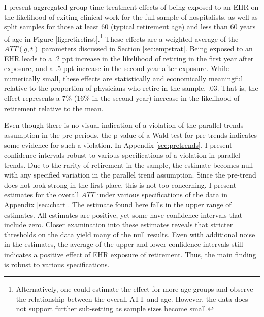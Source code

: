 \documentclass[12pt]{article}
\begin{document}
I present aggregated group time treatment effects of being exposed to an EHR on the likelihood of exiting clinical work for the full sample of hospitalists, as well as split samples for those at least 60 (typical retirement age) and less than 60 years of age in Figure \ref{fig:retirefirst}.\footnote{Alternatively, one could estimate the effect for more age groups and observe the relationship between the overall ATT and age. However, the data does not support further sub-setting as sample sizes become small.} These effects are a weighted average of the $ATT(g,t)$ parameters discussed in Section \ref{sec:empstrat}. Being exposed to an EHR leads to a .2 ppt increase in the likelihood of retiring in the first year after exposure, and a .5 ppt increase in the second year after exposure. While numerically small, these effects are statistically and economically meaningful relative to the proportion of physicians who retire in the sample, .03. That is, the effect represents a 7\% (16\% in the second year) increase in the likelihood of retirement relative to the mean. 

Even though there is no visual indication of a violation of the parallel trends assumption in the pre-periods, the p-value of a Wald test for pre-trends indicates some evidence for such a violation. In Appendix \ref{sec:pretrends}, I present confidence intervals robust to various specifications of a violation in parallel trends. Due to the rarity of retirement in the sample, the estimate becomes null with any specified variation in the parallel trend assumption. Since the pre-trend does not look strong in the first place, this is not too concerning. I present estimates for the overall $ATT$ under various specifications of the data in Appendix \ref{sec:chart}. The estimate found here falls in the upper range of estimates. All estimates are positive, yet some have confidence intervals that include zero. Closer examination into these estimates reveals that stricter thresholds on the data yield many of the null results. Even with additional noise in the estimates, the average of the upper and lower confidence intervals still indicates a positive effect of EHR exposure of retirement. Thus, the main finding is robust to various specifications.   
\end{document}

